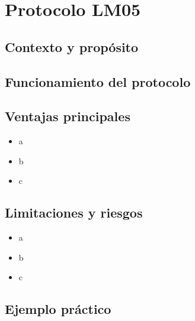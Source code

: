 \section{Protocolo LM05}

\subsection{Contexto y propósito}

\subsection{Funcionamiento del protocolo}


\subsection{Ventajas principales}
\begin{itemize}
    \item a
    \item b
    \item c
\end{itemize}

\subsection{Limitaciones y riesgos}
\begin{itemize}
    \item a
    \item b
    \item c
\end{itemize}

\subsection{Ejemplo práctico}
